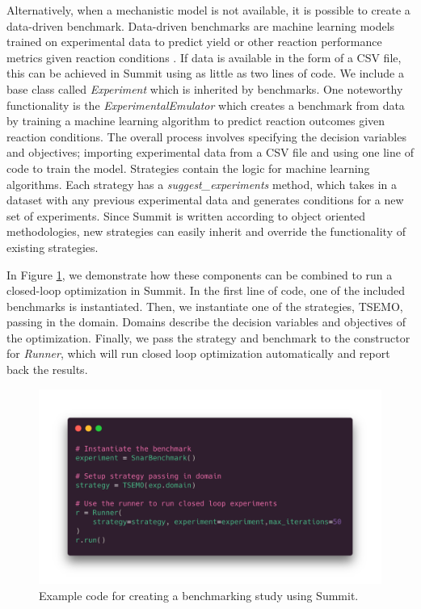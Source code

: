 Alternatively, when a mechanistic model is not available, it is possible to create a data-driven benchmark. Data-driven benchmarks are machine learning models trained on experimental data to predict yield or other reaction performance metrics given reaction conditions \cite{Hase2020a}.  If data is available in the form of a CSV file, this can be achieved in Summit using as little as two lines of code. We include a base class called \textit{Experiment} which is inherited by benchmarks. One noteworthy functionality is the \textit{ExperimentalEmulator} which creates a benchmark from data by training a machine learning algorithm to predict reaction outcomes given reaction conditions. The overall process involves specifying the decision variables and objectives; importing experimental data from a CSV file and using one line of code to train the model. Strategies contain the logic for machine learning algorithms. Each strategy has a \textit{suggest\_experiments} method, which takes in a dataset with any previous experimental data and generates conditions for a new set of experiments.  Since Summit is written according to object oriented methodologies, new strategies can easily inherit and override the functionality of existing strategies.

In Figure \ref{fig:code_example}, we demonstrate how these components can be combined to run a closed-loop optimization in Summit. In the first line of code, one of the included benchmarks is instantiated. Then, we instantiate one of the strategies, TSEMO, passing in the domain. Domains describe the decision variables and objectives of the optimization. Finally, we pass the strategy and benchmark to the constructor for \textit{Runner}, which will run closed loop optimization automatically and report back the results. 

\begin{figure}
    \centering
    \includegraphics[width=\textwidth]{gfx/Chapter02/paraiso.png}
    \caption{Example code for creating a benchmarking study using Summit.}
    \label{fig:code_example}
\end{figure}

